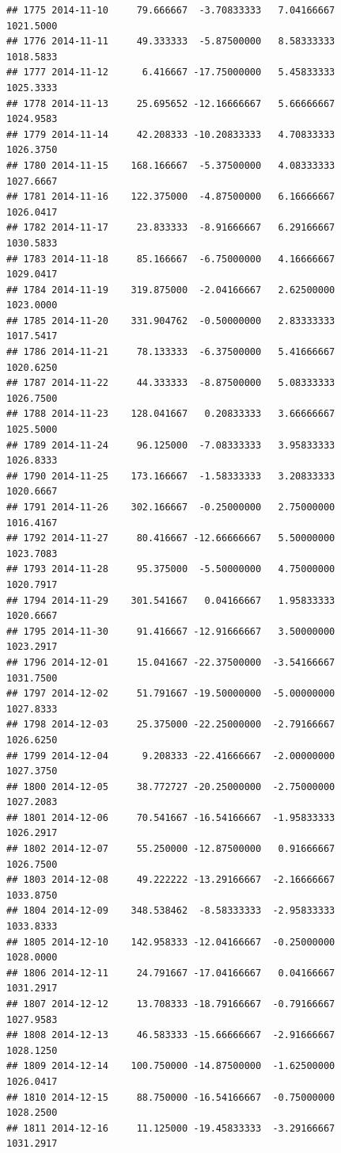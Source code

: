 \documentclass[
]{article}
\begin{document}
\begin{verbatim}
## 1775 2014-11-10     79.666667  -3.70833333   7.04166667    1021.5000
## 1776 2014-11-11     49.333333  -5.87500000   8.58333333    1018.5833
## 1777 2014-11-12      6.416667 -17.75000000   5.45833333    1025.3333
## 1778 2014-11-13     25.695652 -12.16666667   5.66666667    1024.9583
## 1779 2014-11-14     42.208333 -10.20833333   4.70833333    1026.3750
## 1780 2014-11-15    168.166667  -5.37500000   4.08333333    1027.6667
## 1781 2014-11-16    122.375000  -4.87500000   6.16666667    1026.0417
## 1782 2014-11-17     23.833333  -8.91666667   6.29166667    1030.5833
## 1783 2014-11-18     85.166667  -6.75000000   4.16666667    1029.0417
## 1784 2014-11-19    319.875000  -2.04166667   2.62500000    1023.0000
## 1785 2014-11-20    331.904762  -0.50000000   2.83333333    1017.5417
## 1786 2014-11-21     78.133333  -6.37500000   5.41666667    1020.6250
## 1787 2014-11-22     44.333333  -8.87500000   5.08333333    1026.7500
## 1788 2014-11-23    128.041667   0.20833333   3.66666667    1025.5000
## 1789 2014-11-24     96.125000  -7.08333333   3.95833333    1026.8333
## 1790 2014-11-25    173.166667  -1.58333333   3.20833333    1020.6667
## 1791 2014-11-26    302.166667  -0.25000000   2.75000000    1016.4167
## 1792 2014-11-27     80.416667 -12.66666667   5.50000000    1023.7083
## 1793 2014-11-28     95.375000  -5.50000000   4.75000000    1020.7917
## 1794 2014-11-29    301.541667   0.04166667   1.95833333    1020.6667
## 1795 2014-11-30     91.416667 -12.91666667   3.50000000    1023.2917
## 1796 2014-12-01     15.041667 -22.37500000  -3.54166667    1031.7500
## 1797 2014-12-02     51.791667 -19.50000000  -5.00000000    1027.8333
## 1798 2014-12-03     25.375000 -22.25000000  -2.79166667    1026.6250
## 1799 2014-12-04      9.208333 -22.41666667  -2.00000000    1027.3750
## 1800 2014-12-05     38.772727 -20.25000000  -2.75000000    1027.2083
## 1801 2014-12-06     70.541667 -16.54166667  -1.95833333    1026.2917
## 1802 2014-12-07     55.250000 -12.87500000   0.91666667    1026.7500
## 1803 2014-12-08     49.222222 -13.29166667  -2.16666667    1033.8750
## 1804 2014-12-09    348.538462  -8.58333333  -2.95833333    1033.8333
## 1805 2014-12-10    142.958333 -12.04166667  -0.25000000    1028.0000
## 1806 2014-12-11     24.791667 -17.04166667   0.04166667    1031.2917
## 1807 2014-12-12     13.708333 -18.79166667  -0.79166667    1027.9583
## 1808 2014-12-13     46.583333 -15.66666667  -2.91666667    1028.1250
## 1809 2014-12-14    100.750000 -14.87500000  -1.62500000    1026.0417
## 1810 2014-12-15     88.750000 -16.54166667  -0.75000000    1028.2500
## 1811 2014-12-16     11.125000 -19.45833333  -3.29166667    1031.2917

\end{verbatim}
\end{document}
